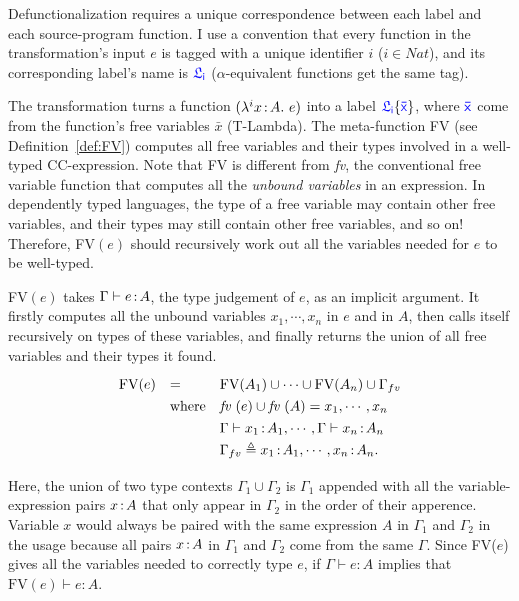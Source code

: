 Defunctionalization requires a unique correspondence between each label and each source-program function.
I use a convention that every function in the transformation's input $e$ is tagged with a unique identifier $i$ ($i \in Nat$), and its corresponding label's name is $\target{\flabel_i}$ ($\alpha$-equivalent functions get the same tag).

The transformation turns a function $(\lambda^{i}x\hspace{0.5mm}{:}\hspace{0.5mm} A.\ e)$ into a label $\targetlab{\flabel_i}{\bar{x}}$, where $\target{\bar{x}}$ come from the function's free variables $\bar{x}$ (T-Lambda). The meta-function FV (see Definition~\ref{def:FV}) computes all free variables and their types involved in a well-typed CC-expression. Note that FV is different from \textit{fv}, the conventional free variable function that computes all the \textit{unbound variables} in an expression. In dependently typed languages, the type of a free variable may contain other free variables, and their types may still contain other free variables, and so on! Therefore, FV$(e)$ should recursively work out all the variables needed for $e$ to be well-typed. 

\begin{definition}FV$(e)$ takes $\Gamma \vdash e \hspace{0.5mm}{:}\hspace{0.5mm} A$, the type judgement of $e$, as an implicit argument. It firstly computes all the unbound variables $x_1, \cdots, x_n$ in $e$ and in $A$, then calls itself recursively on types of these variables, and finally returns the union of all free variables and their types it found. 
\begin{equation*}
\renewcommand{\arraystretch}{1.3}
\begin{array}{l l l}
	\text{FV}(e) & = & \text{FV}(A_1) \cup \cdots \cup \text{FV}(A_n) \cup \Gamma_{fv}\\
	& \text{where} & \textit{fv }(e) \cup \textit{fv }(A) = x_1, \cdots, x_n\\
	& & \Gamma \vdash x_1 \goodcolon A_1, \cdots, \Gamma \vdash x_n \goodcolon A_n\\
	& & \Gamma_{fv} \triangleq x_1 \goodcolon A_1, \cdots, x_n \goodcolon A_n.\\
\end{array}
\end{equation*}
\label{def:FV}
\end{definition}

Here, the union of two type contexts ${\Gamma_1} \cup {\Gamma_2}$ is ${\Gamma_1}$ appended with all the variable-expression pairs ${x} \hspace{0.5mm}{:}\hspace{0.5mm} {A}$ that only appear in ${\Gamma_2}$ in the order of their apperence. Variable $x$ would always be paired with the same expression $A$ in $\Gamma_1$ and $\Gamma_2$ in the usage because all pairs $x \hspace{0.5mm}{:}\hspace{0.5mm} A$ in $\Gamma_1$ and $\Gamma_2$ come from the same $\Gamma$. Since FV($e$) gives all the variables needed to correctly type $e$, if $\Gamma \vdash e : A$ implies that $\text{FV}(e) \vdash e : A$.

